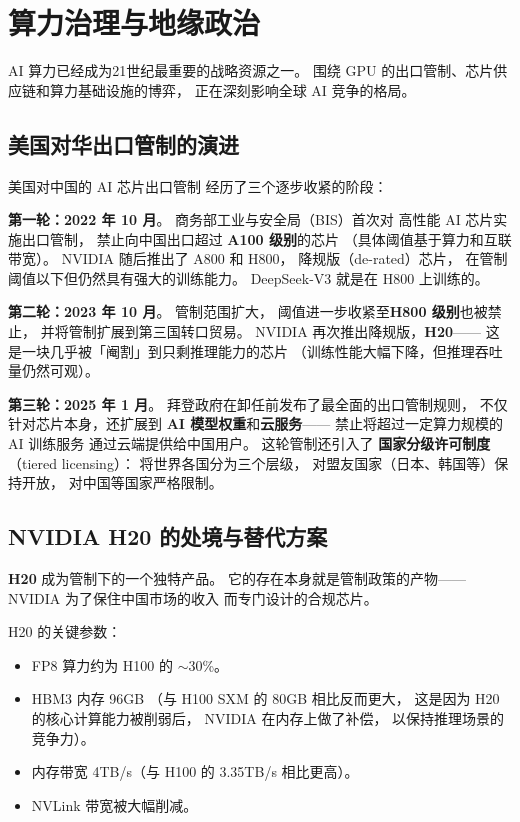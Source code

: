 \section{算力治理与地缘政治}
\label{sec:compute-governance}

AI 算力已经成为21世纪最重要的战略资源之一。
围绕 GPU 的出口管制、芯片供应链和算力基础设施的博弈，
正在深刻影响全球 AI 竞争的格局。

\subsection{美国对华出口管制的演进}

美国对中国的 AI 芯片出口管制
经历了三个逐步收紧的阶段：

\textbf{第一轮：2022 年 10 月}。
商务部工业与安全局（BIS）首次对
高性能 AI 芯片实施出口管制，
禁止向中国出口超过
\textbf{A100 级别}的芯片
（具体阈值基于算力和互联带宽）。
NVIDIA 随后推出了 A800 和 H800，
降规版（de-rated）芯片，
在管制阈值以下但仍然具有强大的训练能力。
DeepSeek-V3 就是在 H800 上训练的。

\textbf{第二轮：2023 年 10 月}。
管制范围扩大，
阈值进一步收紧至\textbf{H800 级别}也被禁止，
并将管制扩展到第三国转口贸易。
NVIDIA 再次推出降规版，\textbf{H20}——
这是一块几乎被「阉割」到只剩推理能力的芯片
（训练性能大幅下降，但推理吞吐量仍然可观）。

\textbf{第三轮：2025 年 1 月}。
拜登政府在卸任前发布了最全面的出口管制规则，
不仅针对芯片本身，还扩展到
\textbf{AI 模型权重}和\textbf{云服务}——
禁止将超过一定算力规模的 AI 训练服务
通过云端提供给中国用户。
这轮管制还引入了
\textbf{国家分级许可制度}（tiered licensing）：
将世界各国分为三个层级，
对盟友国家（日本、韩国等）保持开放，
对中国等国家严格限制。

\subsection{NVIDIA H20 的处境与替代方案}

\textbf{H20} 成为管制下的一个独特产品。
它的存在本身就是管制政策的产物——
NVIDIA 为了保住中国市场的收入
而专门设计的合规芯片。

H20 的关键参数：
\begin{itemize}[noitemsep]
  \item FP8 算力约为 H100 的 $\sim$30\%。
  \item HBM3 内存 96GB
        （与 H100 SXM 的 80GB 相比反而更大，
        这是因为 H20 的核心计算能力被削弱后，
        NVIDIA 在内存上做了补偿，
        以保持推理场景的竞争力）。
  \item 内存带宽 4TB/s（与 H100 的 3.35TB/s 相比更高）。
  \item NVLink 带宽被大幅削减。
\end{itemize}


